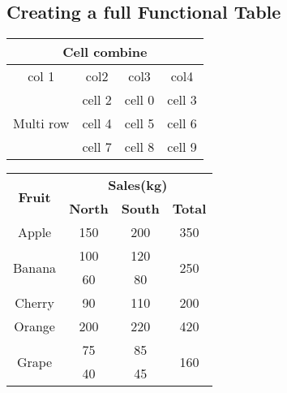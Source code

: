 \documentclass{report}
\begin{document}
\begin{center}
\subsection{Creating a full Functional Table}
\end{center}
    \begin{tabular}{|c|c|c|c|}
       \hline
       \multicolumn{4}{|c|}{Cell combine } \\
       \hline
        col 1 & col2 & col3 & col4  \\
       \hline
       \multirow{3}{*}{Multi row} & cell 2& cell 0 & cell 3 \\
       \cline{2-4}
       & cell 4 & cell 5 & cell 6 \\
       \cline{2-4}
       & cell 7 & cell 8 & cell 9 \\
       \hline
    \end{tabular}

\begin{center}
    \begin{tabular}{|c|c|c|c|}
         \hline
         \multirow{2}{*}{\textbf{Fruit}} & \multicolumn{3}{|c|}{\textbf{Sales(kg) }} \\
         \cline{2-4}
         & \textbf{North} & \textbf{South} & \textbf{Total} \\
         \hline
         Apple & 150 & 200 & 350  \\
         \hline
        \multirow{2}{*}{Banana} & 100 & 120 & \multirow{2}{*}{250} \\
        \cline{2-3}
        & 60 & 80 & \\
        \hline
        Cherry & 90 & 110 & 200 \\
        \hline
        Orange & 200 & 220 & 420 \\
        \hline
        \multirow{2}{*}{Grape} & 75 & 85 & \multirow{2}{*}{160} \\
        \cline{2-3}
        & 40 & 45 & \\
        \hline
        \end{tabular}
\end{center}    
\end{document}
